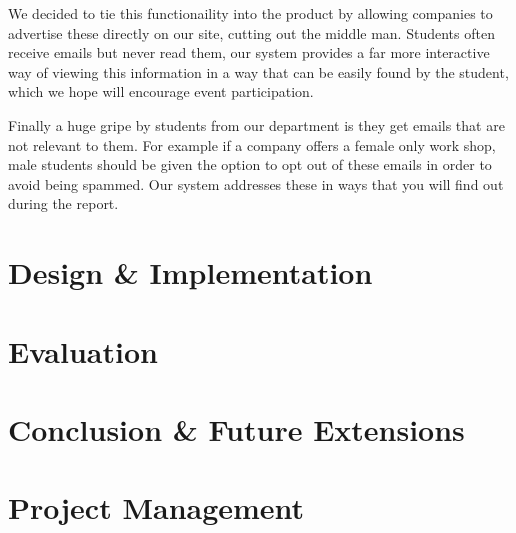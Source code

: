 \documentclass{article}
\begin{document}
We decided to tie this functionaility into the product by allowing companies to advertise these directly on our site, cutting out the middle man.
Students often receive emails but never read them, our system provides a far more interactive way of viewing this information in a way that can be easily found by the student, which we hope will encourage event participation.

Finally a huge gripe by students from our department is they get emails that are not relevant to them. For example if a company offers a female only work shop, male students should be given the option to opt out of these emails in order to avoid being spammed. Our system addresses these in ways that you will find out during the report.


\section{Design \& Implementation}
\section{Evaluation}
\section{Conclusion \& Future Extensions}
\section{Project Management}
\end{document}
